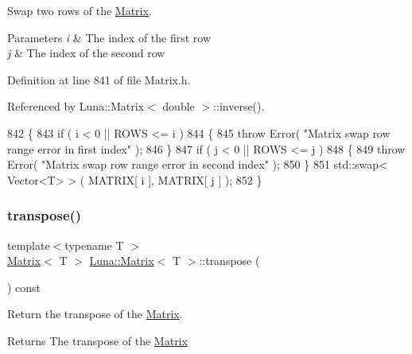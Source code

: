 Swap two rows of the \hyperlink{classLuna_1_1Matrix}{Matrix}. 


\begin{DoxyParams}{Parameters}
{\em i} & The index of the first row \\
\hline
{\em j} & The index of the second row \\
\hline
\end{DoxyParams}


Definition at line 841 of file Matrix.\+h.



Referenced by Luna\+::\+Matrix$<$ double $>$\+::inverse().


\begin{DoxyCode}
842   \{
843     \textcolor{keywordflow}{if} ( i < 0 || ROWS <= i )
844     \{
845       \textcolor{keywordflow}{throw} Error( \textcolor{stringliteral}{"Matrix swap row range error in first index"} );
846     \}
847     \textcolor{keywordflow}{if} ( j < 0 || ROWS <= j )
848     \{
849       \textcolor{keywordflow}{throw} Error( \textcolor{stringliteral}{"Matrix swap row range error in second index"} );
850     \}
851     std::swap< Vector<T> > ( MATRIX[ i ], MATRIX[ j ] );
852   \}
\end{DoxyCode}
\mbox{\label{classLuna_1_1Matrix_ac37dcb8d2dc12b18df3ce416016aabf9}} 
\subsubsection{\texorpdfstring{transpose()}{transpose()}}
{\footnotesize\ttfamily template$<$typename T $>$ \\
\hyperlink{classLuna_1_1Matrix}{Matrix}$<$ T $>$ \hyperlink{classLuna_1_1Matrix}{Luna\+::\+Matrix}$<$ T $>$\+::transpose (\begin{DoxyParamCaption}{ }\end{DoxyParamCaption}) const\hspace{0.3cm}{\ttfamily [inline]}}



Return the transpose of the \hyperlink{classLuna_1_1Matrix}{Matrix}. 

\begin{DoxyReturn}{Returns}
The transpose of the \hyperlink{classLuna_1_1Matrix}{Matrix} 
\end{DoxyReturn}


